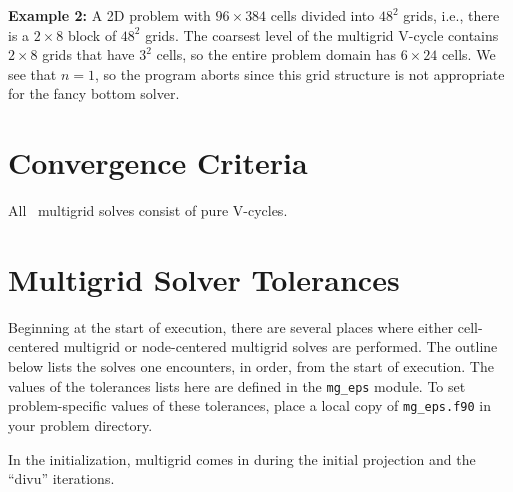 {\bf Example 2:} A 2D problem with $96\times 384$ cells divided into $48^2$ grids, i.e., 
there is a $2\times 8$ block of $48^2$ grids.  The coarsest level of the multigrid 
V-cycle contains $2\times 8$ grids that have $3^2$ cells, so the entire problem 
domain has $6\times 24$ cells.  We see that $n=1$, so the program aborts since this grid
structure is not appropriate for the fancy bottom solver.




\section{Convergence Criteria}

All \maestro\ multigrid solves consist of pure V-cycles.  


\section{Multigrid Solver Tolerances}

\label{sec:mgtol}

Beginning at the start of execution, there are several places where
either cell-centered multigrid or node-centered multigrid solves are
performed.  The outline below lists the solves one encounters, in order,
from the start of execution.  The values of the tolerances lists here
are defined in the {\tt mg\_eps} module.  To set problem-specific values
of these tolerances, place a local copy of {\tt mg\_eps.f90} in your
problem directory.

In the initialization, multigrid comes in during the initial projection
and the ``divu'' iterations.

